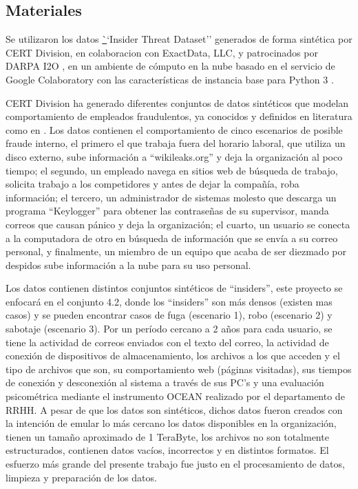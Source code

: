\documentclass[runningheads]{llncs}
\begin{document}
\subsection{Materiales}
\label{sec:materiales}

Se utilizaron los datos \href{https://resources.sei.cmu.edu/library/asset-view.cfm?assetid=508099} ``Insider Threat Dataset''  generados de forma sintética por CERT Division, en colaboracion con  ExactData, LLC, y patrocinados por DARPA I2O \cite{insider_threat_test_dataset_2016}, en un ambiente de cómputo en la nube basado en el servicio de Google Colaboratory con las características de instancia base para Python 3 \cite{colab}. 

CERT Division ha generado diferentes conjuntos de datos sintéticos que modelan comportamiento de empleados fraudulentos, ya conocidos y definidos en literatura como en \cite{cappelli2012cert}. Los datos contienen el comportamiento de cinco escenarios de posible fraude interno, el primero el que trabaja fuera del horario laboral, que utiliza un disco externo, sube información a ``wikileaks.org'' y deja la organización al poco tiempo; el segundo, un empleado navega en sitios web de búsqueda de trabajo, solicita trabajo a los competidores y antes de dejar la compañía, roba información; el tercero, un administrador de sistemas molesto que descarga un programa ``Keylogger'' para obtener las contraseñas de su supervisor, manda correos que causan pánico y deja la organización; el cuarto, un usuario se conecta a la computadora de otro en búsqueda de información que se envía a su correo personal, y finalmente, un miembro de un equipo que acaba de ser diezmado por despidos sube información a la nube para su uso personal.

Los datos contienen distintos conjuntos sintéticos de ``insiders'', este proyecto se enfocará en el conjunto 4.2, donde los ``insiders'' son más densos (existen mas casos) y se pueden encontrar casos de fuga (escenario 1), robo (escenario 2) y sabotaje (escenario 3). Por un período cercano a 2 años para cada usuario, se tiene la actividad de correos enviados con el texto del correo, la actividad de conexión de dispositivos de almacenamiento, los archivos a los que acceden y el tipo de archivos que son, su comportamiento web (páginas visitadas), sus tiempos de conexión y desconexión al sistema a través de sus PC's y una evaluación psicométrica mediante el instrumento OCEAN realizado por el departamento de RRHH. A pesar de que los datos son sintéticos, dichos datos fueron creados con la intención de emular lo más cercano los datos disponibles en la organización, tienen un tamaño aproximado de 1 TeraByte, los archivos no son totalmente estructurados,  contienen datos vacíos, incorrectos y en distintos formatos. El esfuerzo más grande del presente trabajo fue justo en el procesamiento de datos, limpieza y preparación de los datos. 
\end{document}
